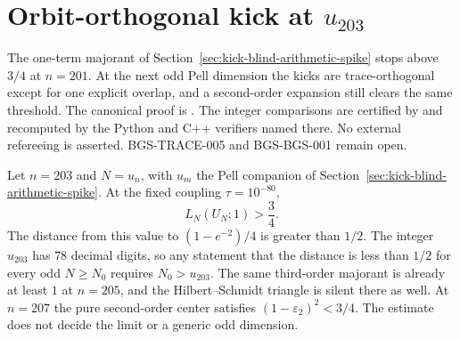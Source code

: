 \section{Orbit-orthogonal kick at \(u_{203}\)}
\label{sec:orbit-orthogonal-kick-spike}
The one-term majorant of Section~\ref{sec:kick-blind-arithmetic-spike} stops
above \(3/4\) at \(n=201\). At the next odd Pell dimension the kicks are
trace-orthogonal except for one explicit overlap, and a second-order
expansion still clears the same threshold. The canonical proof is
.
The integer comparisons are certified by
 and recomputed by the
Python and C++ verifiers named there. No external refereeing is asserted.
BGS-TRACE-005 and BGS-BGS-001 remain open.

\begin{theorem}
\label{thm:orbit-orthogonal-spike}
Let \(n=203\) and \(N=u_n\), with \(u_m\) the Pell companion of
Section~\ref{sec:kick-blind-arithmetic-spike}. At the fixed coupling
\(\tau=10^{-80}\),
\[
 L_N(U_N;1)>\frac34.
\]
The distance from this value to \((1-e^{-2})/4\) is greater than \(1/2\).
The integer \(u_{203}\) has \(78\) decimal digits, so any statement that the
distance is less than \(1/2\) for every odd \(N\ge N_0\) requires
\(N_0>u_{203}\). The same third-order majorant is already at least \(1\) at
\(n=205\), and the Hilbert--Schmidt triangle is silent there as well.
At \(n=207\) the pure second-order center satisfies \((1-\varepsilon_2)^2<3/4\).
The estimate does not decide the limit or a generic odd dimension.
\end{theorem}

